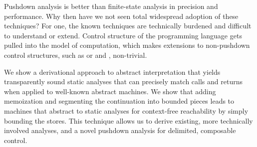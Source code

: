 Pushdown analysis is better than finite-state analysis in precision and
performance. Why then have we not seen total widespread adoption of these
techniques? For one, the known techniques are technically burdened and
difficult to understand or extend. Control structure of the programming language
gets pulled into the model of computation, which makes extensions to
non-pushdown control structures, such as  or  and
, non-trivial.

We show a derivational approach to abstract interpretation that yields
transparently sound static analyses that can precisely match calls and
returns when applied to well-known abstract machines. We show that
adding memoization and segmenting the continuation into bounded pieces
leads to machines that abstract to static analyses for context-free
reachability by simply bounding the stores. This technique allows us
to derive existing, more technically involved analyses, and a novel
pushdown analysis for delimited, composable control.
